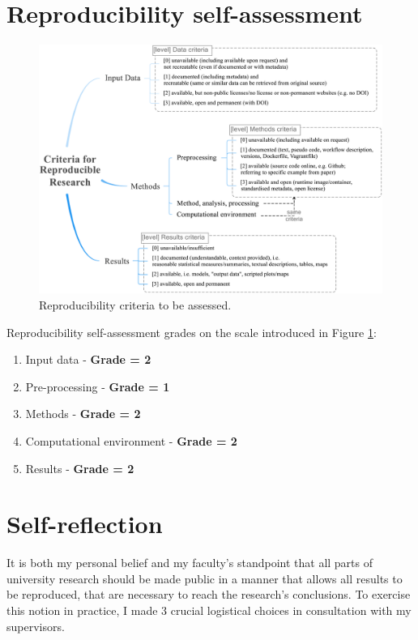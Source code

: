 
\section{Reproducibility self-assessment}
\label{sec:reproducibility}

\begin{figure}[h]
  \centering
  \includegraphics[width=0.9\linewidth]{figs/reproducibility_criteria.png}
  \caption{Reproducibility criteria to be assessed.}
\label{fig:reproducibility_criteria}
\end{figure}


Reproducibility self-assessment grades on the scale introduced in Figure \ref{fig:reproducibility_criteria}:

\begin{enumerate}
  \item Input data - \textbf{Grade = 2}
  \item Pre-processing - \textbf{Grade = 1}
  \item Methods - \textbf{Grade = 2}
  \item Computational environment - \textbf{Grade = 2}
  \item Results - \textbf{Grade = 2}
\end{enumerate}

\section{Self-reflection} 

It is both my personal belief and my faculty's standpoint that all parts of university research should be made public in a manner that allows all results to be reproduced, that are necessary to reach the research's conclusions. To exercise this notion in practice, I made 3 crucial logistical choices in consultation with my supervisors.

